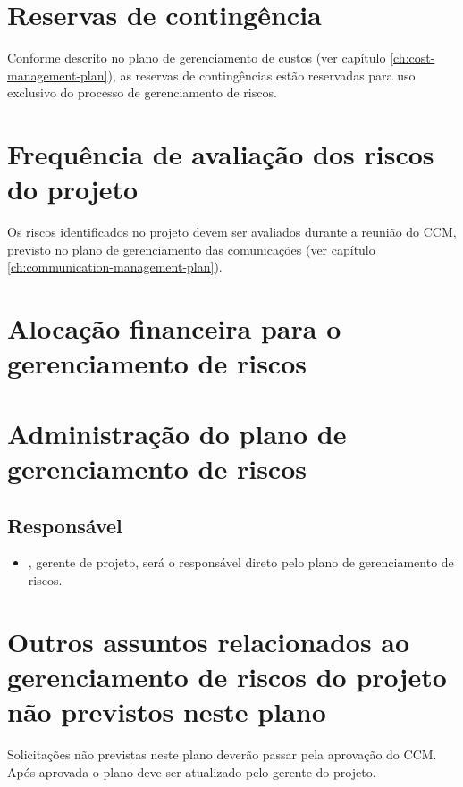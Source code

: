 \section{Reservas de contingência}

Conforme descrito no plano de gerenciamento de custos (ver capítulo \ref{ch:cost-management-plan}), as reservas de contingências estão reservadas para uso exclusivo do processo de gerenciamento de riscos.

\section{Frequência de avaliação dos riscos do projeto}

Os riscos identificados no projeto devem ser avaliados durante a reunião do CCM, previsto no plano de gerenciamento das comunicações (ver capítulo \ref{ch:communication-management-plan}).

\section{Alocação financeira para o gerenciamento de riscos}

\section{Administração do plano de gerenciamento de riscos}

\subsection{Responsável}

\begin{itemize}
	\item \projectManagerName{}, gerente de projeto, será o responsável direto pelo plano de gerenciamento de riscos.
\end{itemize}

\section{Outros assuntos relacionados ao gerenciamento de riscos do projeto não previstos neste plano}

Solicitações não previstas neste plano deverão passar pela aprovação do CCM. Após aprovada o plano deve ser atualizado pelo gerente do projeto.

